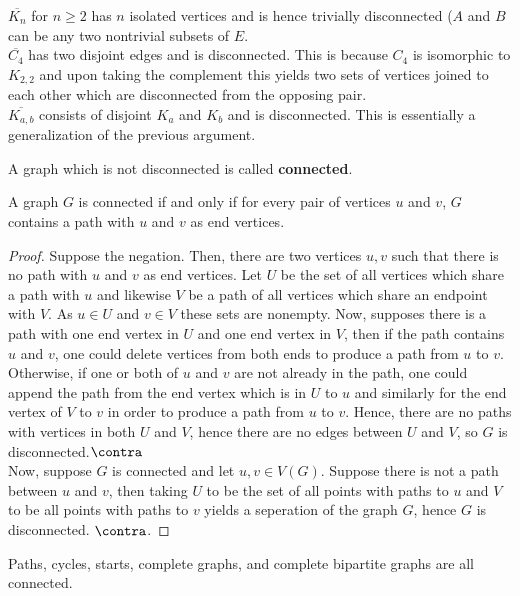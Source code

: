 \begin{example}
	$\overline{K_{n}}$ for $n\ge 2$ has $n$ isolated vertices and is hence trivially disconnected ($A$ and $B$ can be any two nontrivial subsets of $E$.\\
	$\overline{C_4}$ has two disjoint edges and is disconnected. This is because $C_4$ is isomorphic to $K_{2,2}$ and upon taking the complement this yields two sets of vertices joined to each other which are disconnected from the opposing pair.\\
	$\overline{K_{a,b}}$ consists of disjoint  $K_{a}$ and $K_{b}$ and is disconnected. This is essentially a generalization of the previous argument.
\end{example}
\begin{definition}
	A graph which is not disconnected is called \textbf{connected}.
\end{definition}
\begin{theorem}
	A graph $G$ is connected if and only if for every pair of vertices $u$ and $v$, $G$ contains a path with $u$ and $v$ as end vertices.
\end{theorem}
\begin{proof}
	Suppose the negation. Then, there are two vertices $u, v$ such that there is no path with $u$ and $v$ as end vertices. Let  $U$ be the set of all vertices which share a path with $u$ and likewise $V$ be a path of all vertices which share an endpoint with $V$.  As $u \in U$ and $v \in V$ these sets are nonempty. Now, supposes there is a path with one end vertex in $U$ and one end vertex in $V$, then if the path contains $u$ and $v$, one could delete vertices from both ends to produce a path from $u$ to $v$. Otherwise, if one or both of $u$ and $v$ are not already in the path, one could append the path from the end vertex which is in $U$ to $u$ and similarly for the end vertex of $V$ to $v$ in order to produce a path from $u$ to $v$. Hence, there are no paths with vertices in both $U$ and $V$, hence there are no edges between $U$ and $V$, so $G$ is disconnected.$\contra$\\
	Now, suppose $G$ is connected and let $u, v \in V\left( G \right) $. Suppose there is not a path between $u$ and $v$, then taking $U$ to be the set of all points with paths to $u$ and $V$ to be all points with paths to $v$ yields a seperation of the graph $G$, hence $G$ is disconnected. $\contra$.
\end{proof}
\begin{example}
	Paths, cycles, starts, complete graphs, and complete bipartite graphs are all connected.
\end{example}
